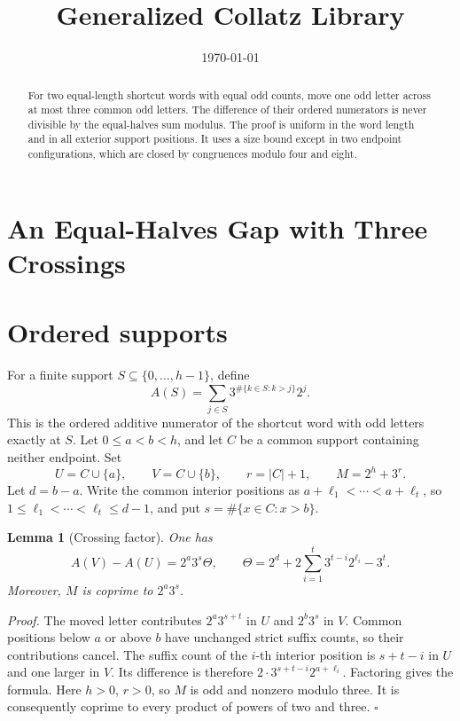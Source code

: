 \documentclass[11pt,letterpaper]{article}
\title{Generalized Collatz Library}
\author{}
\date{\today}
\newtheorem{lemma}[theorem]{Lemma}
\newenvironment{proof}{\noindent\textit{Proof.}}{\hfill\(\square\)}
\begin{document}
\maketitle
\section*{An Equal-Halves Gap with Three Crossings}

\begin{abstract}
For two equal-length shortcut words with equal odd counts, move one odd
letter across at most three common odd letters. The difference of their
ordered numerators is never divisible by the equal-halves sum modulus.
The proof is uniform in the word length and in all exterior support
positions. It uses a size bound except in two endpoint configurations,
which are closed by congruences modulo four and eight.
\end{abstract}

\section{Ordered supports}

For a finite support \(S\subseteq\{0,\ldots,h-1\}\), define
\[
A(S)=\sum_{j\in S}3^{\#\{k\in S:k>j\}}2^j.
\]
This is the ordered additive numerator of the shortcut word with odd
letters exactly at \(S\). Let \(0\le a<b<h\), and let \(C\) be a common
support containing neither endpoint. Set
\[
U=C\cup\{a\},\qquad V=C\cup\{b\},\qquad
r=|C|+1,\qquad M=2^h+3^r.
\]
Let \(d=b-a\). Write the common interior positions as
\(a+\ell_1<\cdots<a+\ell_t\), so
\(1\le\ell_1<\cdots<\ell_t\le d-1\), and put
\(s=\#\{x\in C:x>b\}\).

\begin{lemma}[Crossing factor]
One has
\[
A(V)-A(U)=2^a3^s\Theta,\qquad
\Theta=2^d+2\sum_{i=1}^t3^{t-i}2^{\ell_i}-3^t.
\]
Moreover, \(M\) is coprime to \(2^a3^s\).
\end{lemma}
\begin{proof}
The moved letter contributes \(2^a3^{s+t}\) in \(U\) and \(2^b3^s\)
in \(V\). Common positions below \(a\) or above \(b\) have unchanged
strict suffix counts, so their contributions cancel. The suffix count
of the \(i\)-th interior position is \(s+t-i\) in \(U\) and one larger
in \(V\). Its difference is therefore
\(2\cdot3^{s+t-i}2^{a+\ell_i}\). Factoring gives the formula.
Here \(h>0\), \(r>0\), so \(M\) is odd and nonzero modulo three.
It is consequently coprime to every product of powers of two and three.
\end{proof}
\end{document}
